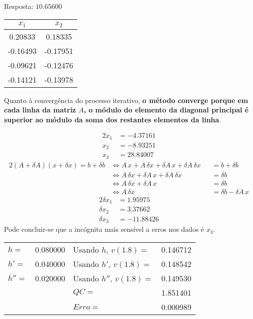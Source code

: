 \setcounter{chapter}{11}


Resposta: $10.65600$

\begin{center} \begin{tabular}{c | c}
	$x_1$ & $x_2$ \\ \hline
	0.20833  &       0.18335 \\
	-0.16493 &       -0.17951 \\
	-0.09621 &       -0.12476 \\
	-0.14121 &       -0.13978
\end{tabular} \end{center}
Quanto à convergência do processo iterativo, \textbf{o método converge porque em cada linha da matriz $A$, o módulo do elemento da diagonal principal é superior ao módulo da soma dos restantes elementos da linha}.


\begin{alignat*}{2}
	x_1 &= -4.37161 \\
	x_2 &= -8.93251 \\
	x_3 &= 28.84007
\end{alignat*}
\begin{alignat*}{2}
	(A+\delta A)(x+\delta x)=b+\delta b
	&\iff A\,x+A\,\delta x+\delta A\, x + \delta A\, \delta x &&= b+\delta b\\
	&\iff A\,\delta x+\delta A\, x + \delta A\, \delta x &&= \delta b\\
	&\iff A\,\delta x+\delta A\, x &&= \delta b\\
	&\iff A\,\delta x &&= \delta b - \delta A\, x
\end{alignat*}
\begin{alignat*}{2}
	\delta x_1 &= 1.95975\\
	\delta x_2 &= 3.37662\\
	\delta x_3 &= -11.88426
\end{alignat*}
Pode concluir-se que a incógnita mais sensível a erros nos dados é $x_3$.
\begin{center} \begin{tabular}{l | c || l | c}
	$h  =$ & 0.080000 & Usando $h  $, $v(1.8)=$ & 0.146712 \\
	$h' =$ & 0.040000 & Usando $h' $, $v(1.8)=$ & 0.148542 \\
	$h''=$ & 0.020000 & Usando $h''$, $v(1.8)=$ & 0.149530 \\
           &          & $QC=$                   & 1.851401 \\
           &          & $Erro=$                 & 0.000989
\end{tabular} \end{center}
